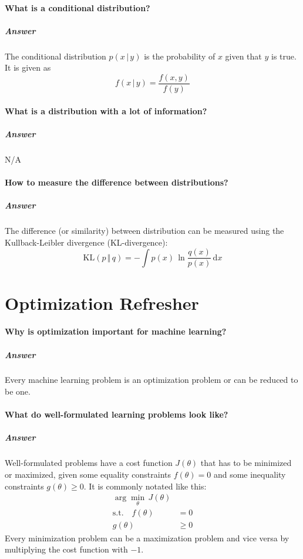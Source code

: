\documentclass[a4paper, 11pt, accentcolor = tud3b]{tudreport}
\newcommand{\answer}[1]{\subparagraph{Answer} #1}
\newcommand{\given}{\ensuremath{\,\vert\,}}
\newcommand{\dif}[1]{\ensuremath{\,\mathrm{d}#1}}
\begin{document}
			\paragraph{What is a conditional distribution?}
			\answer{The conditional distribution \( p(x \given y) \) is the probability of \(x\) given that \(y\) is true. It is given as \[ f(x \given y) = \frac{f(x, y)}{f(y)} \]}

			\paragraph{What is a distribution with a lot of information?}
			\answer{N/A} %

			\paragraph{How to measure the difference between distributions?}
			\answer{The difference (or similarity) between distribution can be measured using the Kullback-Leibler divergence (KL-divergence): \[ \textrm{KL}(p \,\Vert\, q) = -\int p(x) \, \ln \frac{q(x)}{p(x)} \dif{x} \]}

		\section{Optimization Refresher}
			\paragraph{Why is optimization important for machine learning?}
			\answer{Every machine learning problem is an optimization problem or can be reduced to be one.}

			\paragraph{What do well-formulated learning problems look like?}
			\answer{
				Well-formulated problems have a cost function \( J(\theta) \) that has to be minimized or maximized, given some equality constraints \( f(\theta) = 0 \) and some inequality constraints \( g(\theta) \geq 0 \). It is commonly notated like this:
				\begin{align*}
					\arg\min\limits_\theta \, J(\theta) & \\
					\textrm{s.t.} \quad
					f(\theta) &= 0 \\
					g(\theta) &\geq 0
				\end{align*}
				Every minimization problem can be a maximization problem and vice versa by multiplying the cost function with \(-1\).
			}
\end{document}
